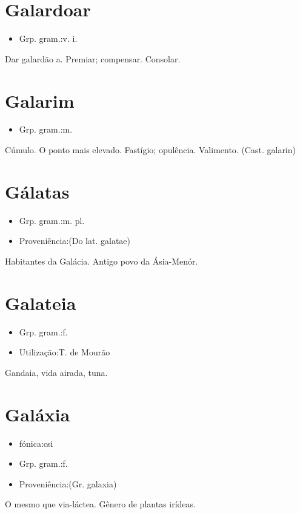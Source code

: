 \section{Galardoar}
\begin{itemize}
\item {Grp. gram.:v. i.}
\end{itemize}
Dar galardão a.
Premiar; compensar.
Consolar.
\section{Galarim}
\begin{itemize}
\item {Grp. gram.:m.}
\end{itemize}
Cúmulo.
O ponto mais elevado.
Fastígio; opulência.
Valimento.
(Cast. \textunderscore galarin\textunderscore )
\section{Gálatas}
\begin{itemize}
\item {Grp. gram.:m. pl.}
\end{itemize}
\begin{itemize}
\item {Proveniência:(Do lat. \textunderscore galatae\textunderscore )}
\end{itemize}
Habitantes da Galácia.
Antigo povo da Ásia-Menór.
\section{Galateia}
\begin{itemize}
\item {Grp. gram.:f.}
\end{itemize}
\begin{itemize}
\item {Utilização:T. de Mourão}
\end{itemize}
Gandaia, vida airada, tuna.
\section{Galáxia}
\begin{itemize}
\item {fónica:csi}
\end{itemize}
\begin{itemize}
\item {Grp. gram.:f.}
\end{itemize}
\begin{itemize}
\item {Proveniência:(Gr. \textunderscore galaxia\textunderscore )}
\end{itemize}
O mesmo que \textunderscore via-láctea\textunderscore .
Gênero de plantas irídeas.
